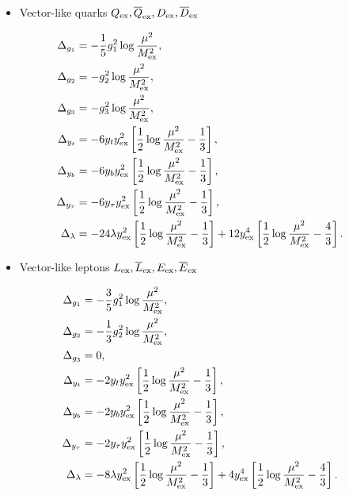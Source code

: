 \documentclass[12pt]{article}
\begin{document}
\begin{itemize}
 \item Vector-like quarks $Q_{\rm ex}, \overline{Q}_{\rm
       ex}, D_{\rm ex}, \overline{D}_{\rm ex}$
\end{itemize}
\begin{align}
 \Delta_{g_1} &= - \frac{1}{5} g_1^2 \log \frac{\mu^2}{M_{\rm ex}^2},\\
 \Delta_{g_2} &= - g_2^2 \log \frac{\mu^2}{M_{\rm ex}^2}, \\
 \Delta_{g_3} &= - g_3^2 \log \frac{\mu^2}{M_{\rm ex}^2}, \\
 \Delta_{y_t} &= - 6 y_t y_{\rm ex}^2 \left[ \frac{1}{2} \log
 \frac{\mu^2}{M_{\rm ex}^2} - \frac{1}{3} \right],\\
 \Delta_{y_b} &= - 6 y_b y_{\rm ex}^2 \left[ \frac{1}{2} \log
 \frac{\mu^2}{M_{\rm ex}^2} - \frac{1}{3} \right],\\
 \Delta_{y_\tau} &= - 6 y_\tau y_{\rm ex}^2 \left[ \frac{1}{2} \log
 \frac{\mu^2}{M_{\rm ex}^2} - \frac{1}{3} \right],\\
 \Delta_{\lambda} &= - 24 \lambda y_{\rm ex}^2 \left[ \frac{1}{2} \log
 \frac{\mu^2}{M_{\rm ex}^2} - \frac{1}{3} \right] + 12 y_{\rm ex}^4 \left[
 \frac{1}{2} \log \frac{\mu^2}{M_{\rm ex}^2} - \frac{4}{3} \right].
\end{align}

\begin{itemize}
 \item Vector-like leptons $L_{\rm ex}, \overline{L}_{\rm
       ex}, E_{\rm ex}, \overline{E}_{\rm ex}$
\end{itemize}
\begin{align}
 \Delta_{g_1} &= - \frac{3}{5} g_1^2 \log \frac{\mu^2}{M_{\rm ex}^2},\\
 \Delta_{g_2} &= - \frac{1}{3} g_2^2 \log \frac{\mu^2}{M_{\rm ex}^2}, \\
 \Delta_{g_3} &= 0, \\
 \Delta_{y_t} &= - 2 y_t y_{\rm ex}^2 \left[ \frac{1}{2} \log
 \frac{\mu^2}{M_{\rm ex}^2} - \frac{1}{3} \right],\\
 \Delta_{y_b} &= - 2 y_b y_{\rm ex}^2 \left[ \frac{1}{2} \log
 \frac{\mu^2}{M_{\rm ex}^2} - \frac{1}{3} \right],\\
 \Delta_{y_\tau} &= - 2 y_\tau y_{\rm ex}^2 \left[ \frac{1}{2} \log
 \frac{\mu^2}{M_{\rm ex}^2} - \frac{1}{3} \right],\\
 \Delta_{\lambda} &= - 8 \lambda y_{\rm ex}^2 \left[ \frac{1}{2} \log
 \frac{\mu^2}{M_{\rm ex}^2} - \frac{1}{3} \right] + 4 y_{\rm ex}^4 \left[
 \frac{1}{2} \log \frac{\mu^2}{M_{\rm ex}^2} - \frac{4}{3} \right].
\end{align}
\end{document}

